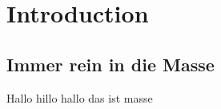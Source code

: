 \chapter{Introduction}\label{chap:introduction}

\section{Immer rein in die Masse}\label{sec:masse}
Hallo hillo hallo \cite{Kristan21} das ist masse
